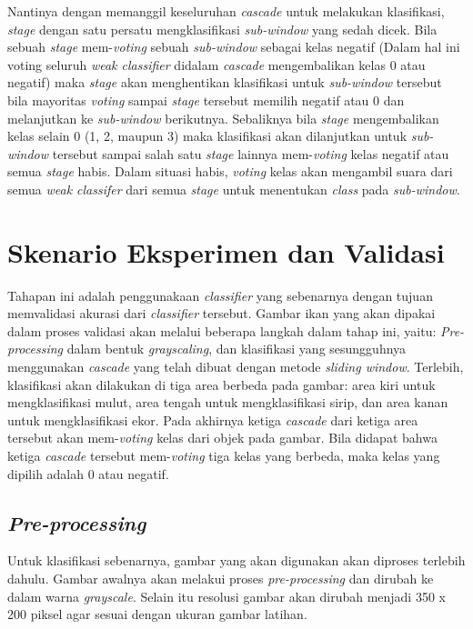 Nantinya dengan memanggil keseluruhan \textit{cascade} untuk melakukan 
klasifikasi, \textit{stage} dengan satu persatu mengklasifikasi 
\textit{sub-window} yang sedah dicek. Bila sebuah \textit{stage} 
mem-\textit{voting} sebuah \textit{sub-window} sebagai kelas negatif 
(Dalam hal ini voting seluruh \textit{weak classifier} didalam \textit{cascade} 
mengembalikan kelas 0 atau negatif) maka \textit{stage} akan menghentikan 
klasifikasi untuk \textit{sub-window} tersebut bila mayoritas \textit{voting} 
sampai \emph{stage} tersebut memilih negatif atau 0 dan melanjutkan ke 
\textit{sub-window} berikutnya. Sebaliknya bila \textit{stage} mengembalikan 
kelas selain 0 (1, 2, maupun 3) maka klasifikasi akan dilanjutkan 
untuk \textit{sub-window} tersebut sampai salah satu \textit{stage} lainnya 
mem-\textit{voting} kelas negatif atau semua \textit{stage} habis. 
Dalam situasi habis, \textit{voting} kelas akan mengambil suara dari semua 
\textit{weak classifer} dari semua \textit{stage} untuk menentukan \emph{class} 
pada \textit{sub-window}.


\section{Skenario Eksperimen dan Validasi}

Tahapan ini adalah penggunakaan \emph{classifier} yang sebenarnya dengan tujuan 
memvalidasi akurasi dari \emph{classifier} tersebut. 
Gambar ikan yang akan dipakai dalam proses validasi akan 
melalui beberapa langkah dalam tahap ini, 
yaitu: \textit{Pre-processing} dalam bentuk \emph{grayscaling}, 
dan klasifikasi yang sesungguhnya menggunakan \emph{cascade} 
yang telah dibuat dengan metode \textit{sliding window}. Terlebih, klasifikasi akan dilakukan di 
tiga area berbeda pada gambar: area kiri untuk mengklasifikasi mulut, area tengah untuk mengklasifikasi sirip, 
dan area kanan untuk mengklasifikasi ekor. Pada akhirnya ketiga \textit{cascade} 
dari ketiga area tersebut akan mem-\textit{voting} kelas dari objek pada gambar. 
Bila didapat bahwa ketiga \textit{cascade} tersebut mem-\textit{voting} tiga 
kelas yang berbeda, maka kelas yang dipilih adalah 0 atau negatif. 

\subsection{\textit{Pre-processing}}

Untuk klasifikasi sebenarnya, gambar yang akan digunakan 
akan diproses terlebih dahulu. 
Gambar awalnya akan melakui proses \textit{pre-processing} dan dirubah ke dalam warna 
\emph{grayscale}. %
Selain itu resolusi gambar akan dirubah menjadi 350 x 200 piksel agar sesuai 
dengan ukuran gambar latihan.

